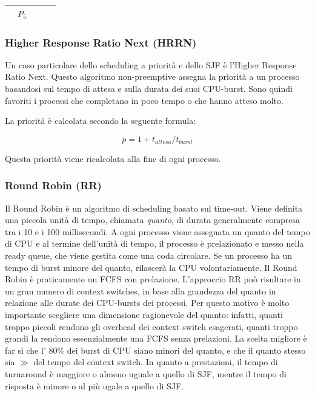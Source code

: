 \documentclass[a4paper]{article}
\begin{document}
\begin{table}[htb]
\begin{tabular}{|c|ccccc|cccccccccc|ccc|c|}
                                                             & \multicolumn{5}{c|}{\cellcolor[HTML]{656565}$P_5$} & \multicolumn{10}{c|}{}                              & \multicolumn{3}{c|}{}                              &                                                                                                     \\ \hline
    \end{tabular}
\end{table}


\subsubsection{Higher Response Ratio Next (HRRN)}
Un caso particolare dello scheduling a priorità e dello SJF è l'Higher Response Ratio Next. Questo algoritmo non-preemptive assegna la priorità a un processo basandosi sul tempo di attesa e sulla durata dei suoi CPU-burst. Sono quindi favoriti i processi che completano in poco tempo o che hanno atteso molto.

La priorità è calcolata secondo la seguente formula:

$$
    p = 1 + t_{attesa}/t_{burst}
$$

Questa priorità viene ricalcolata alla fine di ogni processo.

\subsubsection{Round Robin (RR)}
Il Round Robin è un algoritmo di scheduling basato sul time-out. Viene definita una piccola unità di tempo, chiamata \textit{quanto}, di durata generalmente compresa tra i 10 e i 100 millisecondi. A ogni processo viene assegnata un quanto del tempo di CPU e al termine dell'unità di tempo, il processo è prelazionato e messo nella ready queue, che viene gestita come una coda circolare. Se un processo ha un tempo di burst minore del quanto, rilascerà la CPU volontariamente. Il Round Robin è praticamente un FCFS con prelazione.
L'approccio RR può risultare in un gran numero di context switches, in base alla grandezza del quanto in relazione alle durate dei CPU-bursts dei processi. Per questo motivo è molto importante scegliere una dimensione ragionevole del quanto: infatti, quanti troppo piccoli rendono gli overhead dei context switch esagerati, quanti troppo grandi la rendono essenzialmente una FCFS senza prelazioni. La scelta migliore è far sì che l' 80\% dei burst di CPU siano minori del quanto, e che il quanto stesso sia $\gg$ del tempo del context switch.\newline
In quanto a prestazioni, il tempo di turnaround è maggiore o almeno uguale a quello di SJF, mentre il tempo di risposta è minore o al più ugale a quello di SJF.
\end{document}
